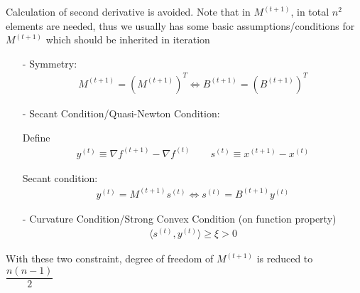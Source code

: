     Calculation of second derivative is avoided. Note that in $ M^{(t+1)} $, in total $ n^2 $ elements are needed, thus we usually has some basic assumptions/conditions for $ M^{(t+1)} $ which should be inherited in iteration
\begin{itemize}[topsep=2pt,itemsep=0pt]
    \item[-] Symmetry:
    \begin{align}
        M^{(t+1)}=\left(M^{(t+1)}\right) ^T\Leftrightarrow B^{(t+1)}=\left(B^{(t+1)}\right)^T
    \end{align}
    \item[-] Secant Condition/Quasi-Newton Condition:
    
    Define
    \begin{align}
        y^{(t)}\equiv \nabla f^{(t+1)}-\nabla f^{(t)}\qquad s^{(t)}\equiv x^{(t+1)}-x^{(t)} 
    \end{align}
    
    Secant condition:
    \begin{align}
        y^{(t)}=M^{(t+1)}s^{(t)}\Leftrightarrow s^{(t)}=B^{(t+1)}y^{(t)} 
    \end{align}
    \item[-] Curvature Condition/Strong Convex Condition (on function property)
    \begin{align}
        \langle s^{(t)}, y^{(t)}\rangle\geq \xi >0 
    \end{align}
    
    
\end{itemize}

    With these two constraint, degree of freedom of $ M^{(t+1)} $ is reduced to $ \dfrac{n(n-1)}{2} $
    
    \\




